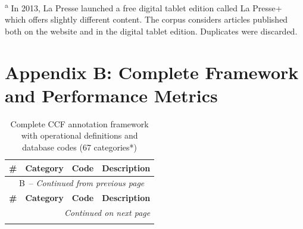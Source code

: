 \documentclass[12pt]{article}
\renewcommand\_{\texttt{\detokenize{_}\allowbreak}}
\begin{document}
\vspace{0.5em}
\noindent\footnotesize\textsuperscript{a} In 2013, La Presse launched a free digital tablet edition called La Presse+ which offers slightly different content. The corpus considers articles published both on the website and in the digital tablet edition. Duplicates were discarded.
\endlandscape

\setcounter{table}{0}
\renewcommand{\thetable}{B\arabic{table}}
\renewcommand\theHtable{AppendixB.\thetable}

\landscape
\section{Appendix B: Complete Framework and Performance Metrics}
\label{sec:appendix}
{\footnotesize
{}
\begin{longtable}{p{0.5cm}p{4.5cm}p{2.8cm}p{13.5cm}}
\caption{Complete CCF annotation framework with operational definitions and database codes (67 categories*)}
\label{tab:complete_framework}
 \\
\toprule
\textbf{\#} & \textbf{Category} & \textbf{Code} & \textbf{Description} \\
\midrule
\endfirsthead
\multicolumn{4}{c}{\tablename\ \thetable\ -- \textit{Continued from previous page}} \\
\toprule
\textbf{\#} & \textbf{Category} & \textbf{Code} & \textbf{Description} \\
\midrule
\endhead
\midrule
\multicolumn{4}{r}{\textit{Continued on next page}} \\
\endfoot
\bottomrule
\endlastfoot


\end{longtable}}
\end{document}
